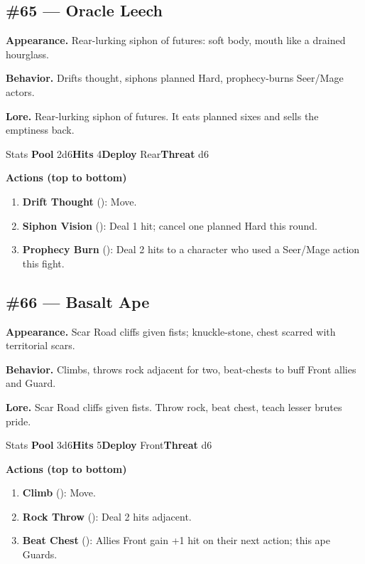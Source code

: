 \subsection*{\#65 --- Oracle Leech}

\textbf{Appearance.} Rear-lurking siphon of futures: soft body, mouth like a drained hourglass.

\textbf{Behavior.} Drifts thought, siphons planned Hard, prophecy-burns Seer/Mage actors.

\textbf{Lore.} Rear-lurking siphon of futures. It eats planned sixes and sells the emptiness back.

\begin{monsterentry}{Stats}
\textbf{Pool} 2d6\quad\textbf{Hits} 4\quad\textbf{Deploy} Rear\quad\textbf{Threat} d6

\textbf{Actions (top to bottom)}
\begin{enumerate}\setlength{\itemsep}{0.15em}\setlength{\parskip}{0pt}
  \item \textbf{Drift Thought} (\easy): Move.
  \item \textbf{Siphon Vision} (\medium): Deal 1 hit; cancel one planned Hard this round.
  \item \textbf{Prophecy Burn} (\hard): Deal 2 hits to a character who used a Seer/Mage action this fight.
\end{enumerate}
\end{monsterentry}

\subsection*{\#66 --- Basalt Ape}

\textbf{Appearance.} Scar Road cliffs given fists; knuckle-stone, chest scarred with territorial scars.

\textbf{Behavior.} Climbs, throws rock adjacent for two, beat-chests to buff Front allies and Guard.

\textbf{Lore.} Scar Road cliffs given fists. Throw rock, beat chest, teach lesser brutes pride.

\begin{monsterentry}{Stats}
\textbf{Pool} 3d6\quad\textbf{Hits} 5\quad\textbf{Deploy} Front\quad\textbf{Threat} d6

\textbf{Actions (top to bottom)}
\begin{enumerate}\setlength{\itemsep}{0.15em}\setlength{\parskip}{0pt}
  \item \textbf{Climb} (\easy): Move.
  \item \textbf{Rock Throw} (\medium): Deal 2 hits adjacent.
  \item \textbf{Beat Chest} (\hard): Allies Front gain +1 hit on their next action; this ape Guards.
\end{enumerate}
\end{monsterentry}

